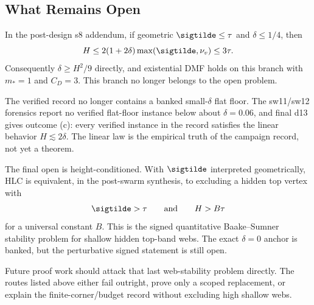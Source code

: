\subsection{What Remains Open}

\begin{proposition}
\provedbadge In the post-design s8 addendum, if geometric \(\sigtilde\le\tau\) and
\(\delta\le1/4\), then
\[
  H\le 2(1+2\delta)\max(\sigtilde,\nu_v)\le 3\tau .
\]
Consequently \(\delta\ge H^2/9\) directly, and existential DMF holds on this branch with
\(m_*=1\) and \(C_D=3\).  This branch no longer belongs to the open problem.
\end{proposition}

\begin{numericalresult}
\numbadge The verified record no longer contains a banked small-\(\delta\) flat floor.
The sw11/sw12 forensics report no verified flat-floor instance below about
\(\delta=0.06\), and final d13 gives outcome (c): every verified instance in the record
satisfies the linear behavior \(H\lesssim 2\delta\).  The linear law is the empirical
truth of the campaign record, not yet a theorem.
\end{numericalresult}

\begin{openproblem}
\openbadge The final open is height-conditioned.  With \(\sigtilde\) interpreted
geometrically, HLC is equivalent, in the post-swarm synthesis, to excluding a hidden top
vertex with
\[
  \sigtilde>\tau
  \qquad\text{and}\qquad
  H>B\tau
\]
for a universal constant \(B\).  This is the signed quantitative Baake--Sumner stability
problem for shallow hidden top-band webs.  The exact \(\delta=0\) anchor is banked, but
the perturbative signed statement is still open.
\end{openproblem}

Future proof work should attack that last web-stability problem directly.  The routes
listed above either fail outright, prove only a scoped replacement, or explain the
finite-corner/budget record without excluding high shallow webs.
